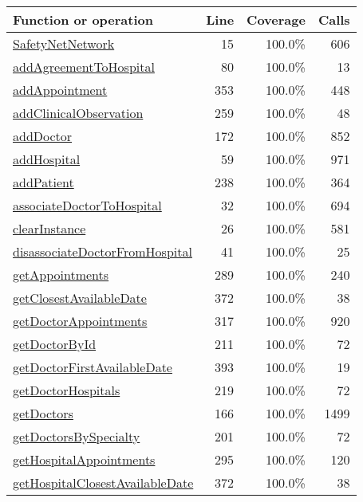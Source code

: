 \begin{longtable}{|l|r|r|r|}
\hline
Function or operation & Line & Coverage & Calls \\
\hline
\hline
\hyperref[SafetyNetNetwork:15]{SafetyNetNetwork} & 15&100.0\% & 606 \\
\hline
\hyperref[addAgreementToHospital:80]{addAgreementToHospital} & 80&100.0\% & 13 \\
\hline
\hyperref[addAppointment:353]{addAppointment} & 353&100.0\% & 448 \\
\hline
\hyperref[addClinicalObservation:259]{addClinicalObservation} & 259&100.0\% & 48 \\
\hline
\hyperref[addDoctor:172]{addDoctor} & 172&100.0\% & 852 \\
\hline
\hyperref[addHospital:59]{addHospital} & 59&100.0\% & 971 \\
\hline
\hyperref[addPatient:238]{addPatient} & 238&100.0\% & 364 \\
\hline
\hyperref[associateDoctorToHospital:32]{associateDoctorToHospital} & 32&100.0\% & 694 \\
\hline
\hyperref[clearInstance:26]{clearInstance} & 26&100.0\% & 581 \\
\hline
\hyperref[disassociateDoctorFromHospital:41]{disassociateDoctorFromHospital} & 41&100.0\% & 25 \\
\hline
\hyperref[getAppointments:289]{getAppointments} & 289&100.0\% & 240 \\
\hline
\hyperref[getClosestAvailableDate:372]{getClosestAvailableDate} & 372&100.0\% & 38 \\
\hline
\hyperref[getDoctorAppointments:317]{getDoctorAppointments} & 317&100.0\% & 920 \\
\hline
\hyperref[getDoctorById:211]{getDoctorById} & 211&100.0\% & 72 \\
\hline
\hyperref[getDoctorFirstAvailableDate:393]{getDoctorFirstAvailableDate} & 393&100.0\% & 19 \\
\hline
\hyperref[getDoctorHospitals:219]{getDoctorHospitals} & 219&100.0\% & 72 \\
\hline
\hyperref[getDoctors:166]{getDoctors} & 166&100.0\% & 1499 \\
\hline
\hyperref[getDoctorsBySpecialty:201]{getDoctorsBySpecialty} & 201&100.0\% & 72 \\
\hline
\hyperref[getHospitalAppointments:295]{getHospitalAppointments} & 295&100.0\% & 120 \\
\hline
\hyperref[getHospitalClosestAvailableDate:372]{getHospitalClosestAvailableDate} & 372&100.0\% & 38 \\

\end{longtable}
